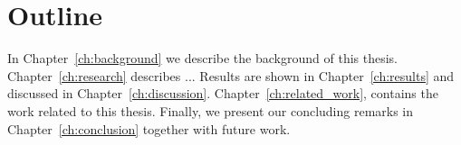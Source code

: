 \section{Outline}
In Chapter~\ref{ch:background} we describe the background of this thesis. 
Chapter~\ref{ch:research} describes ... 
Results are shown in Chapter~\ref{ch:results} and discussed in Chapter~\ref{ch:discussion}. Chapter~\ref{ch:related_work}, contains the work related to this thesis.
Finally, we present our concluding remarks in Chapter~\ref{ch:conclusion} together with future work.

